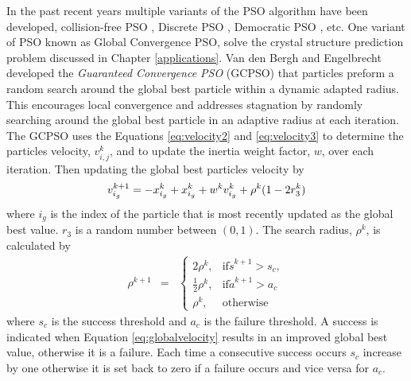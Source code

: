 In the past recent years multiple variants of the PSO algorithm have been developed, collision-free PSO \cite{}, Discrete PSO \cite{}, Democratic PSO \cite{}, etc. One variant of PSO known as Global Convergence PSO, solve the crystal structure prediction problem discussed in Chapter \ref{applications}. Van den Bergh and Engelbrecht \cite{} developed the \textit{Guaranteed Convergence PSO} (GCPSO) that particles preform a random search around the global best particle within a dynamic adapted radius.
This encourages local convergence and addresses stagnation by randomly searching around the global best particle in an adaptive radius at each iteration. The GCPSO uses the Equations \ref{eq:velocity2} and \ref{eq:velocity3} to determine the particles velocity, $v^k_{i,j}$, and to update the inertia weight factor, $w$, over each iteration. Then updating the global best particles velocity by
\begin{equation}
    \label{eq:globalvelocity}
    v^{k+1}_{i_g} = -x^k_{i_g} + x^k_{i_g} + w^k v^k_{i_g} + \rho^k(1-2r^k_3) \\
\end{equation}
where $i_g$ is the index of the particle that is most recently updated as the global best value. $r_3$ is a random number between $(0,1)$. The search radius, $\rho^k$, is calculated by
\begin{eqnarray}
    \rho^{k+1} & = &
    \begin{cases}
        2\rho^k, &\text{if} \check{s}^{k+1} > s_c,\\
        \frac{1}{2}\rho^k, &\text{if} \check{a}^{k+1}>a_c\\
        \rho^k, & \mbox{otherwise}
    \end{cases}
    \label{eq:rho}
\end{eqnarray}
where $s_c$ is the success threshold and $a_c$ is the failure threshold. A success is indicated when Equation \ref{eq:globalvelocity} results in an improved global best value, otherwise it is a failure. Each time a consecutive success occurs $s_c$ increase by one otherwise it is set back to zero if a failure occurs and vice versa for $a_c$. 

    

